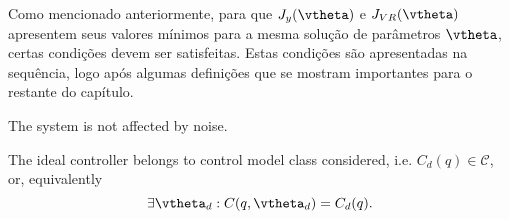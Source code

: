 Como mencionado anteriormente, para que $J_y(\vtheta)$ e  $J_{VR}(\vtheta)$ apresentem seus valores mínimos para a mesma solução de parâmetros $\vtheta$, certas condições devem ser satisfeitas. Estas condições são apresentadas na sequência, logo após algumas definições que se mostram importantes para o restante do capítulo.
 
\begin{defn}
\end{defn}

\begin{assum} 
   The system is not affected by noise.
\end{assum}

\begin{assum} %
   The ideal controller belongs to control model class considered, i.e. $C_d(q) \in \mathscr{C}$, or, equivalently
    \begin{equation}
        \exists \vtheta_d : C(q,\vtheta_d)=C_d(q)
    \label{eq:assumpMatched}.
    \end{equation}
\end{assum}




